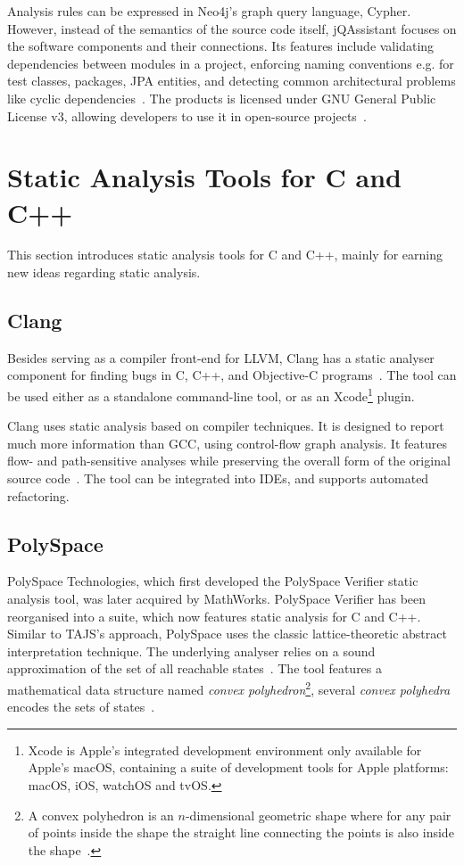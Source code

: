 Analysis rules can be expressed in Neo4j's graph query language, Cypher. However, instead of the semantics of the source code itself, jQAssistant focuses on the software components and their connections. Its features include validating dependencies between modules in a project, enforcing naming conventions e.g. for test classes, packages, JPA entities, and detecting common architectural problems like cyclic dependencies~\cite{jqassistant-documentation}. The products is licensed under GNU General Public License v3, allowing developers to use it in open-source projects~\cite{gplv3}.


\section{Static Analysis Tools for C and C++}

This section introduces static analysis tools for C and C++, mainly for earning new ideas regarding static analysis.


\subsection{Clang}

Besides serving as a compiler front-end for LLVM, Clang has a static analyser component for finding bugs in C, C++, and Objective-C programs~\cite{clang-analyser-website}. The tool can be used either as a standalone command-line tool, or as an Xcode\footnote{Xcode is Apple's integrated development environment only available for Apple's macOS, containing a suite of development tools for Apple platforms: macOS, iOS, watchOS and tvOS.} plugin.

Clang uses static analysis based on compiler techniques. It is designed to report much more information than GCC, using control-flow graph analysis. It features flow- and path-sensitive analyses while preserving the overall form of the original source code~\cite{kremenek2008finding}. The tool can be integrated into IDEs, and supports automated refactoring.


\subsection{PolySpace}

PolySpace Technologies, which first developed the PolySpace Verifier static analysis tool, was later acquired by MathWorks. PolySpace Verifier has been reorganised into a suite, which now features static analysis for C and C++. Similar to TAJS's approach, PolySpace uses the classic lattice-theoretic abstract interpretation technique. The underlying analyser relies on a sound approximation of the set of all reachable states~\cite{emanuelsson2008comparative}. The tool features a mathematical data structure named \emph{convex polyhedron}\footnote{A convex polyhedron is an $n$-dimensional geometric shape where for any pair of points inside the shape the straight line connecting the points is also inside the shape~\cite{emanuelsson2008comparative}.}, several \emph{convex polyhedra} encodes the sets of states~\cite{cousot1978automatic}.


